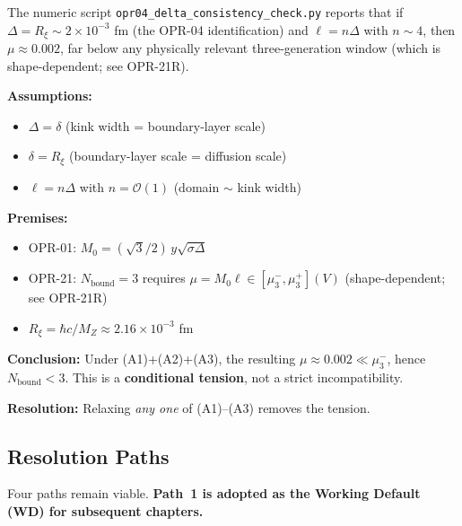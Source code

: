 The numeric script \texttt{opr04\_delta\_consistency\_check.py} reports that
if $\Delta = R_\xi \sim 2 \times 10^{-3}$ fm (the OPR-04 identification) and
$\ell = n\Delta$ with $n \sim 4$, then $\mu \approx 0.002$, far below any
physically relevant three-generation window (which is shape-dependent; see OPR-21R).

\begin{tcolorbox}[colback=purple!5!white, colframe=purple!50!black,
    title=\textbf{Lemma 16.1: Conditional Tension under (A1)--(A3)}]
\label{lemma:ch16_conditional_tension}

\textbf{Assumptions:}
\begin{itemize}[nosep]
    \item[(A1)] $\Delta = \delta$ (kink width = boundary-layer scale)
    \item[(A2)] $\delta = R_\xi$ (boundary-layer scale = diffusion scale)
    \item[(A3)] $\ell = n\Delta$ with $n = \mathcal{O}(1)$ (domain $\sim$ kink width)
\end{itemize}

\textbf{Premises:}
\begin{itemize}[nosep]
    \item OPR-01: $M_0 = (\sqrt{3}/2)\,y\sqrt{\sigma\Delta}$ \tagDc{}
    \item OPR-21: $N_{\text{bound}} = 3$ requires $\mu = M_0\ell \in [\mu_3^-, \mu_3^+](V)$
          (shape-dependent; see OPR-21R) \tagDc{}
    \item $R_\xi = \hbar c/M_Z \approx 2.16 \times 10^{-3}$ fm \tagBL{}
\end{itemize}

\textbf{Conclusion:}
Under (A1)+(A2)+(A3), the resulting $\mu \approx 0.002 \ll \mu_3^-$, hence
$N_{\text{bound}} < 3$. This is a \textbf{conditional tension}, not a strict
incompatibility.

\textbf{Resolution:} Relaxing \emph{any one} of (A1)--(A3) removes the tension.
\end{tcolorbox}

\subsection{Resolution Paths}
\label{subsec:ch16_resolution_paths}

Four paths remain viable. \textbf{Path~1 is adopted as the Working Default (WD)
for subsequent chapters.}

